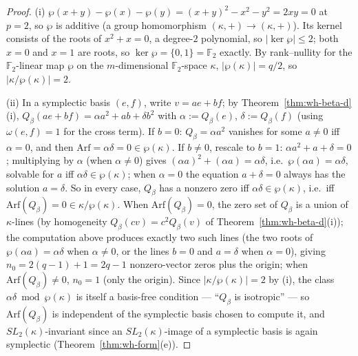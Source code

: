 \begin{proof}
(i) $\wp(x+y)-\wp(x)-\wp(y) = (x+y)^2-x^2-y^2 = 2xy = 0$ at $p=2$, so $\wp$
is additive (a group homomorphism $(\kappa,+)\to(\kappa,+)$). Its kernel
consists of the roots of $x^2+x=0$, a degree-$2$ polynomial, so
$|\ker\wp|\leq 2$; both $x=0$ and $x=1$ are roots, so $\ker\wp=\{0,1\}=\mathbb{F}_2$
exactly. By rank--nullity for the $\mathbb{F}_2$-linear map $\wp$ on the
$m$-dimensional $\mathbb{F}_2$-space $\kappa$, $|\wp(\kappa)|=q/2$, so
$|\kappa/\wp(\kappa)|=2$.

(ii) In a symplectic basis $(e,f)$, write $v=ae+bf$; by
Theorem~\ref{thm:wh-beta-d}(i), $Q_\beta(ae+bf)=\alpha a^2+ab+\delta b^2$
with $\alpha:=Q_\beta(e)$, $\delta:=Q_\beta(f)$ (using $\omega(e,f)=1$ for
the cross term). If $b=0$: $Q_\beta=\alpha a^2$ vanishes for some $a\neq 0$
iff $\alpha=0$, and then $\mathrm{Arf}=\alpha\delta=0\in\wp(\kappa)$. If
$b\neq 0$, rescale to $b=1$: $\alpha a^2+a+\delta=0$; multiplying by $\alpha$
(when $\alpha\neq 0$) gives $(\alpha a)^2+(\alpha a)=\alpha\delta$, i.e.\
$\wp(\alpha a)=\alpha\delta$, solvable for $a$ iff $\alpha\delta\in\wp(\kappa)$;
when $\alpha=0$ the equation $a+\delta=0$ always has the solution $a=\delta$.
So in every case, $Q_\beta$ has a nonzero zero iff $\alpha\delta\in\wp(\kappa)$,
i.e.\ iff $\mathrm{Arf}(Q_\beta)=0\in\kappa/\wp(\kappa)$. When
$\mathrm{Arf}(Q_\beta)=0$, the zero set of $Q_\beta$ is a union of
$\kappa$-lines (by homogeneity $Q_\beta(cv)=c^2Q_\beta(v)$ of
Theorem~\ref{thm:wh-beta-d}(i)); the computation above produces exactly two
such lines (the two roots of $\wp(\alpha a)=\alpha\delta$ when $\alpha\neq0$,
or the lines $b=0$ and $a=\delta$ when $\alpha=0$), giving
$n_0 = 2(q-1)+1 = 2q-1$ nonzero-vector zeros plus the origin; when
$\mathrm{Arf}(Q_\beta)\neq 0$, $n_0=1$ (only the origin). Since
$|\kappa/\wp(\kappa)|=2$ by (i), the class $\alpha\delta\bmod\wp(\kappa)$ is
itself a basis-free condition — ``$Q_\beta$ is isotropic'' — so
$\mathrm{Arf}(Q_\beta)$ is independent of the symplectic basis chosen to
compute it, and $SL_2(\kappa)$-invariant since an $SL_2(\kappa)$-image of a
symplectic basis is again symplectic (Theorem~\ref{thm:wh-form}(e)).


\end{proof}
